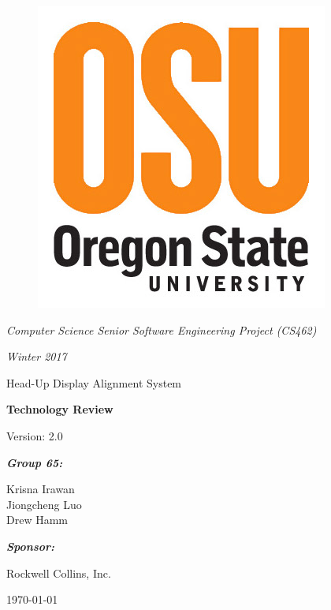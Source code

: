 \documentclass[letterpaper,10pt,onecolumn]{IEEEtran}
\def\title{Computer Science Senior Software Engineering Project (CS462)}
\def\name{Krisna Irawan\\ Jiongcheng Luo\\ Drew Hamm}
\def\doc{Technology Review}
\def\version{2.0}
\def\term{Winter 2017}
\def\project{Head-Up Display Alignment System}
\begin{document}
\begin{titlepage}
\centering
	\begin{figure}
	      	\includegraphics[scale=0.25]{osu_logo}
	\end{figure}
	{\Large\itshape \title\par}
	{\Large\itshape \term\par}
	\vspace{1cm}
	\scshape{
		{\Huge \project\par}
		\vspace{1cm}
		{\Huge\bfseries\doc\par}
		{\large Version: \version\par}
	}
	\vspace{1cm}
	{\large\itshape\bfseries Group 65:\par}
	{\large \name\par}
	\vspace{1cm}
	{\large\itshape\bfseries Sponsor:\par}
	{\large Rockwell Collins, Inc.\par}
	\vspace{2cm}
	{\large \today\par}
	\vspace{4cm}


	\begin{abstract}
		This project is a proof concept to explore a potential technological innovation for Head-Up Display (HUD) system that present critical flight information to pilots.
		The primary objective of this project is to reduce the cost and time required to precisely align flight information to the HUD by introducing additional sensor to the system to make the alignment process more dynamic.
		To achieve this goal, there are eight different main technologies that will be critical for the development of the project. This document will compare three alternative options for each main technologies.
		This document will also include the option that we choose for each main technologies to develop this project. 

	\end{abstract}
\end{titlepage}
\tableofcontents
\end{document}
